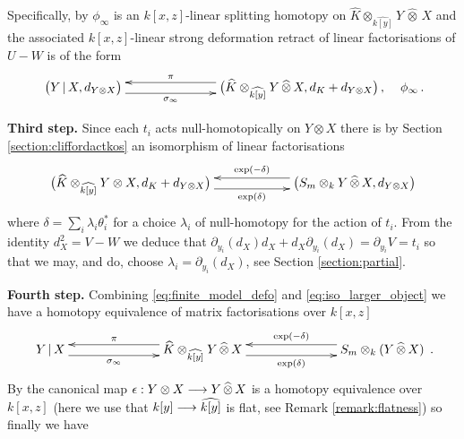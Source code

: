 \documentclass[english,letter paper,12pt,leqno]{article}
\theoremstyle{example}
\numberwithin{equation}{section}
\begin{document}
Specifically, by \cite[Proposition 7.1]{dm1102.2957} $\phi_\infty$ is an $k[x,z]$-linear splitting homotopy on $\widehat{K} \otimes_{\widehat{k[y]}} Y \,\widehat{\otimes}\, X$ and the associated $k[x,z]$-linear strong deformation retract of linear factorisations of $U - W$ is of the form
\begin{equation}\label{eq:finite_model_defo}
\xymatrix@C+4pc{
\big( Y \l X, d_{Y \otimes X} \big) \ar@<-1ex>[r]_-{\sigma_\infty} & \big( \widehat{K} \otimes_{\widehat{k[y]}} Y \,\widehat{\otimes}\, X, d_K + d_{Y \otimes X} \big)\,, \ar@<-1ex>[l]_-{\pi}
} \quad \phi_\infty\,.
\end{equation}

\textbf{Third step.} Since each $t_i$ acts null-homotopically on $Y \otimes X$ there is by Section \ref{section:cliffordactkos} an isomorphism of linear factorisations
\begin{equation}\label{eq:iso_larger_object}
\xymatrix@C+3pc{ \big( \widehat{K} \otimes_{\widehat{k[y]}} Y \otimes X, d_K + d_{Y \otimes X} \big) \ar@<-1ex>[r]_-{ \exp(\delta) } & \big( S_m \otimes_k Y \,\widehat{\otimes}\, X, d_{Y \otimes X} \big)\ar@<-1ex>[l]_-{ \exp(-\delta) } }
\end{equation}
where $\delta = \sum_i \lambda_i \theta_i^*$ for a choice $\lambda_i$ of null-homotopy for the action of $t_i$. From the identity $d^2_X = V - W$ we deduce that $\partial_{y_i}(d_X) d_X + d_X \partial_{y_i}(d_X) = \partial_{y_i} V = t_i$ so that we may, and do, choose $\lambda_i = \partial_{y_i}(d_X)$, see Section \ref{section:partial}.

\vspace{0.3cm}

\textbf{Fourth step.} Combining \eqref{eq:finite_model_defo} and \eqref{eq:iso_larger_object} we have a homotopy equivalence of matrix factorisations over $k[x,z]$
\begin{equation}\label{eq:final_finite_model2}
\xymatrix@C+4pc{
Y \l X \ar@<-1ex>[r]_-{\sigma_\infty} & \widehat{K} \otimes_{\widehat{k[y]}} Y \,\widehat{\otimes}\, X \ar@<-1ex>[l]_-{\pi} \ar@<-1ex>[r]_-{ \exp(\delta) } & S_m \otimes_k ( Y \,\widehat{\otimes}\, X ) \ar@<-1ex>[l]_-{ \exp(-\delta) }
}\,.
\end{equation}
By \cite[Remark 7.7]{dm1102.2957} the canonical map $\epsilon: Y \otimes X \longrightarrow Y \,\widehat{\otimes}\, X$ is a homotopy equivalence over $k[x,z]$ (here we use that $k[y] \longrightarrow \widehat{k[y]}$ is flat, see Remark \ref{remark:flatness}) so finally we have
\end{document}

